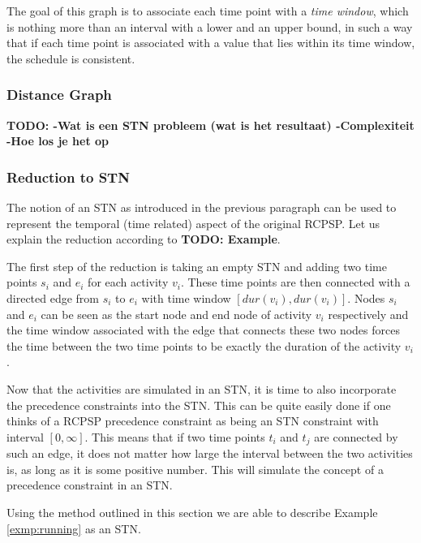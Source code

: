 \documentclass{article}
\theoremstyle{definition}
\newcommand{\TODO}[1]{{\color{red}\textbf{TODO: #1}}}
\newcommand{\dur}[1]{\ensuremath{dur(v_{#1})}} %
\begin{document}
The goal of this graph is to associate each time point with a \emph{time window}, which is nothing more than an interval with a lower and an upper bound, in such a way that if each time point is associated with a value that lies within its time window, the schedule is consistent.

\subsubsection{Distance Graph}
\TODO{
		-Wat is een STN probleem (wat is het resultaat)
		-Complexiteit
		-Hoe los je het op
}

\subsubsection{Reduction to STN}
The notion of an STN as introduced in the previous paragraph can be used to represent the temporal (time related) aspect of the original RCPSP. Let us explain the reduction according to \TODO{Example}.

The first step of the reduction is taking an empty STN and adding two time points $s_i$ and $e_i$ for each activity $v_i$. 
These time points are then connected with a directed edge from $s_i$ to $e_i$ with time window $[\dur{i}, \dur{i}]$. 
Nodes $s_i$ and $e_i$ can be seen as the start node and end node of activity $v_i$ respectively and the time window associated with the edge that connects these two nodes forces the time between the two time points to be exactly the duration of the activity $v_i$.

Now that the activities are simulated in an STN, it is time to also incorporate the precedence constraints into the STN. This can be quite easily done if one thinks of a RCPSP precedence constraint as being an STN constraint with interval $[0,\infty]$. This means that if two time points $t_i$ and $t_j$ are connected by such an edge, it does not matter how large the interval between the two activities is, as long as it is some positive number. This will simulate the concept of a precedence constraint in an STN.

Using the method outlined in this section we are able to describe Example \ref{exmp:running} as an STN.
\end{document}
